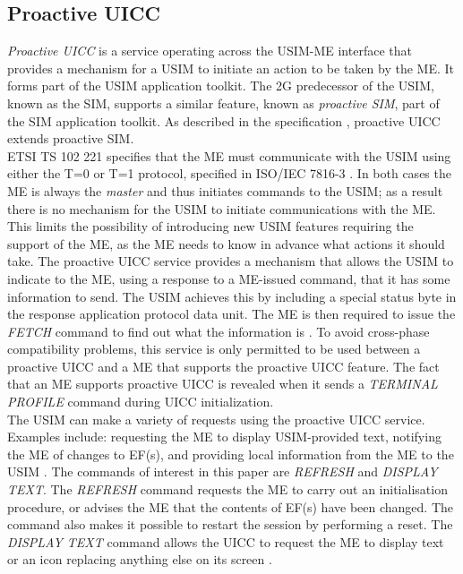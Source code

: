 \documentclass{acm_proc_article-sp}
\begin{document}
\subsection{Proactive UICC}

\emph{Proactive UICC} is a service operating across the USIM-ME interface that provides a mechanism for a USIM to initiate an action to be taken by the ME\@. It forms part of the USIM application toolkit. The 2G predecessor of the USIM, known as the SIM, supports a similar feature, known as \emph{proactive SIM}, part of the SIM application toolkit. As described in the specification \cite{ETSI_TS_131_111}, proactive UICC extends proactive SIM. \\

ETSI TS 102 221 \cite{ETSI_TS_102_221} specifies that the ME must communicate with the USIM using either the T=0 or T=1 protocol, specified in ISO/IEC 7816-3 \cite{ISO_IEC_7816-3}. In both cases the ME is always the \emph{master} and thus initiates commands to the USIM; as a result there is no mechanism for the USIM to initiate communications with the ME\@. This limits the possibility of introducing new USIM features requiring the support of the ME, as the ME needs to know in advance what actions it should take. The proactive UICC service provides a mechanism that allows the USIM to indicate to the ME, using a response to a ME-issued command, that it has some information to send. The USIM achieves this by including a special status byte in the response application protocol data unit. The ME is then required to issue the \emph{FETCH} command to find out what the information is \cite{ETSI_TS_102_223}. To avoid cross-phase compatibility problems, this service is only permitted to be used between a proactive UICC and a ME that supports the proactive UICC feature. The fact that an ME supports proactive UICC is revealed when it sends a \emph{TERMINAL PROFILE} command during UICC initialization.  \\

The USIM can make a variety of requests using the proactive UICC service. Examples include: requesting the ME to display USIM-provided text, notifying the ME of changes to EF(s), and providing local information from the ME to the USIM \cite{ETSI_TS_102_223}. 
The commands of interest in this paper are \emph{REFRESH} and \emph{DISPLAY TEXT}. The \emph{REFRESH} command requests the ME to carry out an initialisation procedure, or advises the ME that the contents of EF(s) have been changed. The command also makes it possible to restart the session by performing a reset. The \emph{DISPLAY TEXT} command allows the UICC to request the ME to display text or an icon replacing anything else on its screen \cite{ETSI_TS_102_223}.
\end{document}
